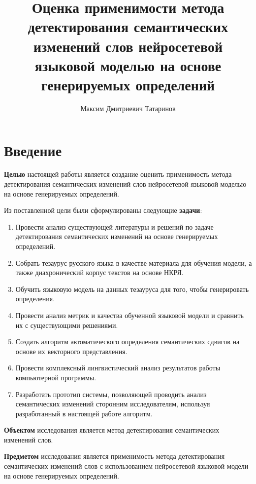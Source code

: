 \documentclass[LI,VKR]{HSEUniversity}
\title{Оценка применимости метода детектирования семантических изменений слов нейросетевой языковой моделью на основе генерируемых определений}
\author{Максим Дмитриевич Татаринов}
\begin{document}
\maketitle

\chapter*{Введение}


\textbf{Целью} настоящей работы является создание оценить применимость метода детектирования семантических изменений слов нейросетевой языковой моделью на основе генерируемых определений.

Из поставленной цели были сформулированы следующие \textbf{задачи}:
\begin{enumerate}
    \item  Провести анализ существующей литературы и решений по задаче детектирования семантических изменений на основе генерируемых определений.
    \item  Собрать тезаурус русского языка в качестве материала для обучения модели, а также диахронический
корпус текстов на основе НКРЯ.
    \item  Обучить языковую модель на данных тезауруса для того, чтобы генерировать определения.
    \item  Провести анализ метрик и качества обученной языковой модели и сравнить их с существующими решениями.
    \item  Создать алгоритм автоматического определения семантических сдвигов на основе их векторного
представления.
    \item  Провести комплексный лингвистический анализ результатов работы компьютерной программы.
    \item  Разработать прототип системы, позволяющей проводить анализ семантических изменений сторонним исследователям, используя разработанный в настоящей работе алгоритм.
\end{enumerate}

\textbf{Объектом} исследования является метод детектирования семантических изменений слов.

\textbf{Предметом} исследования является применимость метода детектирования семантических изменений слов с использованием нейросетевой языковой модели на основе генерируемых определений.
\end{document}
